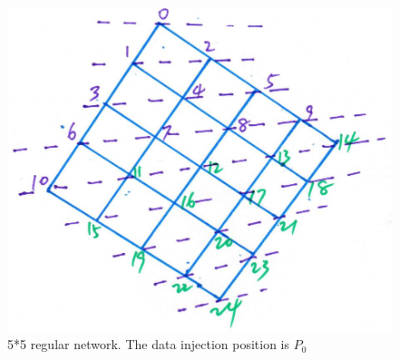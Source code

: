 \begin{figure}[!ht]
\centering
\includegraphics[width=0.55\columnwidth]{figure/5t5.JPG}
\caption{5*5 regular network.  The data injection position is $P_{0}$}
\label{fig:5t5}
\end{figure}

